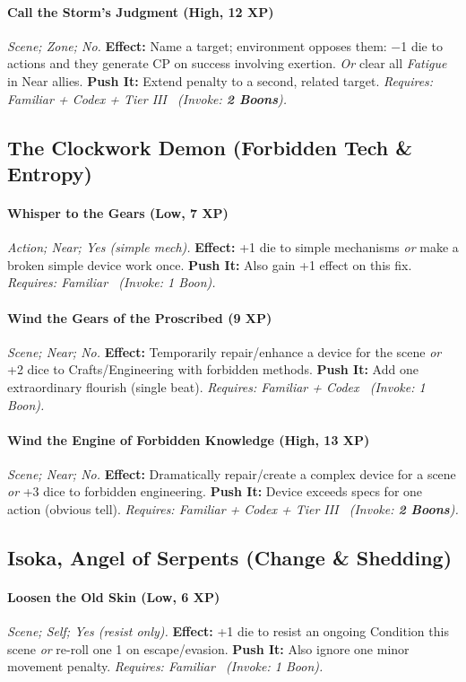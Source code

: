 \documentclass[12pt,twoside]{book}
\begin{document}
\paragraph{Call the Storm's Judgment (High, 12 XP)} \emph{Scene; Zone; No.}
\textbf{Effect:} Name a target; environment opposes them: −1 die to actions and they generate CP on success involving exertion. \emph{Or} clear all \emph{Fatigue} in Near allies.
\textbf{Push It:} Extend penalty to a second, related target.
\emph{Requires: Familiar + Codex + Tier III \ (\textit{Invoke:} \textbf{2 Boons}).}

\subsection{The Clockwork Demon (Forbidden Tech \& Entropy)}
\paragraph{Whisper to the Gears (Low, 7 XP)} \emph{Action; Near; Yes (simple mech).}
\textbf{Effect:} +1 die to simple mechanisms \emph{or} make a broken simple device work once.
\textbf{Push It:} Also gain +1 effect on this fix.
\emph{Requires: Familiar \ (\textit{Invoke:} 1 Boon).}
\paragraph{Wind the Gears of the Proscribed (9 XP)} \emph{Scene; Near; No.}
\textbf{Effect:} Temporarily repair/enhance a device for the scene \emph{or} +2 dice to Crafts/Engineering with forbidden methods.
\textbf{Push It:} Add one extraordinary flourish (single beat).
\emph{Requires: Familiar + Codex \ (\textit{Invoke:} 1 Boon).}
\paragraph{Wind the Engine of Forbidden Knowledge (High, 13 XP)} \emph{Scene; Near; No.}
\textbf{Effect:} Dramatically repair/create a complex device for a scene \emph{or} +3 dice to forbidden engineering.
\textbf{Push It:} Device exceeds specs for one action (obvious tell).
\emph{Requires: Familiar + Codex + Tier III \ (\textit{Invoke:} \textbf{2 Boons}).}

\subsection{Isoka, Angel of Serpents (Change \& Shedding)}
\paragraph{Loosen the Old Skin (Low, 6 XP)} \emph{Scene; Self; Yes (resist only).}
\textbf{Effect:} +1 die to resist an ongoing Condition this scene \emph{or} re-roll one 1 on escape/evasion.
\textbf{Push It:} Also ignore one minor movement penalty.
\emph{Requires: Familiar \ (\textit{Invoke:} 1 Boon).}
\end{document}
